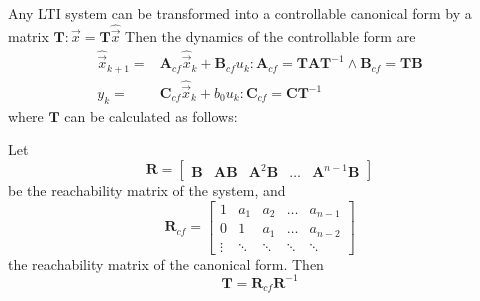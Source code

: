 \documentclass[runningheads,a4paper]{llncs}
\newcommand{\mat}[1]{\boldsymbol{#1}}
\begin{document}
Any LTI system can be transformed into a controllable canonical form by a matrix $\mat{T} : \vec{x}=\mat{T}\hat{\vec{x}}$
Then the dynamics of the controllable form are
\begin{align}
\hat{\vec{x}}_{k+1}=&\mat{A}_{cf}\hat{\vec{x}}_k+\mat{B}_{cf}u_k : \mat{A}_{cf}=\mat{T}\mat{A}\mat{T}^{-1} \wedge \mat{B}_{cf}=\mat{T}\mat{B}\\
y_k=&\mat{C}_{cf}\hat{\vec{x}}_k + b_0u_k : \mat{C}_{cf}=\mat{C}\mat{T}^{-1}\nonumber
\end{align}
where $\mat{T}$ can be calculated as follows:

Let 
\begin{equation}
\mat{R}=[\begin{array}{ccccc}\mat{B}&\mat{A}\mat{B}&\mat{A}^2\mat{B}&\hdots&\mat{A}^{n-1}\mat{B}\end{array}]
\label{eq:rncf}
\end{equation}
be the reachability matrix of the system, and
\begin{equation}
\mat{R}_{cf}=\left[\begin{array}{ccccc}1&a_1&a_2&\hdots&a_{n-1}\\0&1&a_1&\hdots&a_{n-2}\\ \vdots&\ddots&\ddots&\ddots&\ddots\end{array}\right]
\label{eq:rcf}
\end{equation}
the reachability matrix of the canonical form. Then 
\begin{equation}
\mat{T}=\mat{R}_{cf}\mat{R}^{-1}
\label{eq:to_cf}
\end{equation}



\end{document}
